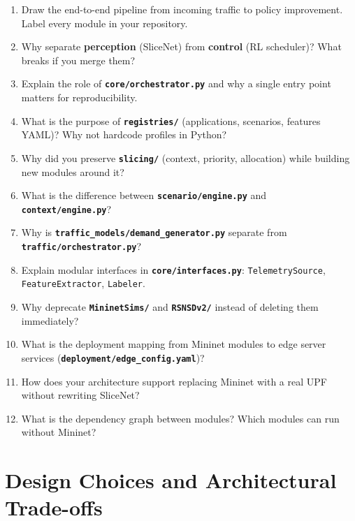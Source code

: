 \documentclass[11pt,a4paper]{article}
\newcommand{\proj}[1]{\textbf{\texttt{#1}}}
\begin{document}
\begin{enumerate}
    \item Draw the end-to-end pipeline from incoming traffic to policy improvement. Label every module in your repository.
    \item Why separate \textbf{perception} (SliceNet) from \textbf{control} (RL scheduler)? What breaks if you merge them?
    \item Explain the role of \proj{core/orchestrator.py} and why a single entry point matters for reproducibility.
    \item What is the purpose of \proj{registries/} (applications, scenarios, features YAML)? Why not hardcode profiles in Python?
    \item Why did you preserve \proj{slicing/} (context, priority, allocation) while building new modules around it?
    \item What is the difference between \proj{scenario/engine.py} and \proj{context/engine.py}?
    \item Why is \proj{traffic\_models/demand\_generator.py} separate from \proj{traffic/orchestrator.py}?
    \item Explain modular interfaces in \proj{core/interfaces.py}: \texttt{TelemetrySource}, \texttt{FeatureExtractor}, \texttt{Labeler}.
    \item Why deprecate \proj{MininetSims/} and \proj{RSNSDv2/} instead of deleting them immediately?
    \item What is the deployment mapping from Mininet modules to edge server services (\proj{deployment/edge\_config.yaml})?
    \item How does your architecture support replacing Mininet with a real UPF without rewriting SliceNet?
    \item What is the dependency graph between modules? Which modules can run without Mininet?
\end{enumerate}

\section{Design Choices and Architectural Trade-offs}
\end{document}
